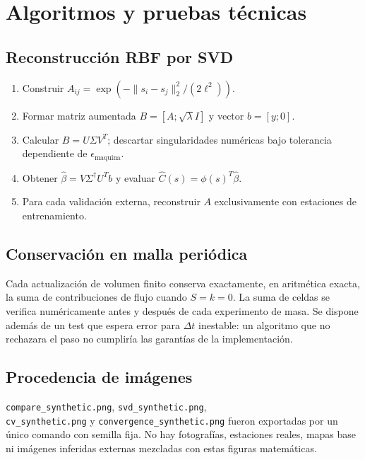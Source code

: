 \section{Algoritmos y pruebas técnicas}
\subsection{Reconstrucción RBF por SVD}
\begin{enumerate}
\item Construir $A_{ij}=\exp(-\|s_i-s_j\|_2^2/(2\ell^2))$.
\item Formar matriz aumentada $B=[A;\sqrt\lambda I]$ y vector $b=[y;0]$.
\item Calcular $B=U\Sigma V^T$; descartar singularidades numéricas bajo tolerancia dependiente de $\epsilon_{\mathrm{maquina}}$.
\item Obtener $\widehat\beta=V\Sigma^\dagger U^Tb$ y evaluar $\widehat C(s)=\phi(s)^T\widehat\beta$.
\item Para cada validación externa, reconstruir $A$ exclusivamente con estaciones de entrenamiento.
\end{enumerate}

\subsection{Conservación en malla periódica}
Cada actualización de volumen finito conserva exactamente, en aritmética exacta, la suma de contribuciones de flujo cuando $S=k=0$. La suma de celdas se verifica numéricamente antes y después de cada experimento de masa. Se dispone además de un test que espera error para $\Delta t$ inestable: un algoritmo que no rechazara el paso no cumpliría las garantías de la implementación.

\subsection{Procedencia de imágenes}
\texttt{compare\_synthetic.png}, \texttt{svd\_synthetic.png},\\ \texttt{cv\_synthetic.png} y \texttt{convergence\_synthetic.png} fueron exportadas por un único comando con semilla fija. No hay fotografías, estaciones reales, mapas base ni imágenes inferidas externas mezcladas con estas figuras matemáticas.
